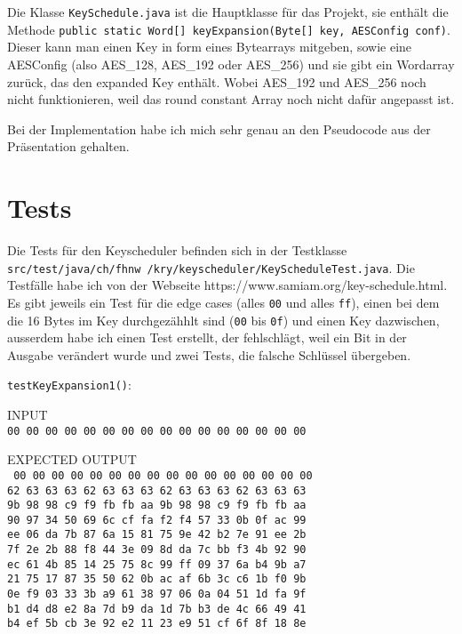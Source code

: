\documentclass[12pt, letterpaper]{article}
\newcommand{\code}[1]{\texttt{#1}}
\begin{document}
Die Klasse \code{KeySchedule.java} ist die Hauptklasse für das Projekt, sie enthält die Methode \code{public static Word[] keyExpansion(Byte[] key, AESConfig conf)}. Dieser kann man einen Key in form eines Bytearrays mitgeben, sowie eine AESConfig (also AES\_128, AES\_192 oder AES\_256) und sie gibt ein Wordarray zurück, das den expanded Key enthält. Wobei AES\_192 und AES\_256 noch nicht funktionieren, weil das round constant Array noch nicht dafür angepasst ist.

Bei der Implementation habe ich mich sehr genau an den Pseudocode aus der Präsentation gehalten.

\newpage
\section*{Tests}
Die Tests für den Keyscheduler befinden sich in der Testklasse \code{src/test/java/ch/fhnw /kry/keyscheduler/KeyScheduleTest.java}. Die Testfälle habe ich von der Webseite https://www.samiam.org/key-schedule.html. Es gibt jeweils ein Test für die edge cases (alles \code{00} und alles \code{ff}), einen bei dem die 16 Bytes im Key durchgezähhlt sind (\code{00} bis \code{0f}) und einen Key dazwischen, ausserdem habe ich einen Test erstellt, der fehlschlägt, weil ein Bit in der Ausgabe verändert wurde und zwei Tests, die falsche Schlüssel übergeben.

\code{testKeyExpansion1()}:

INPUT\\
\code{00 00 00 00 00 00 00 00 00 00 00 00 00 00 00 00}

EXPECTED OUTPUT\\
\code{
00 00 00 00 00 00 00 00 00 00 00 00 00 00 00 00\\
62 63 63 63 62 63 63 63 62 63 63 63 62 63 63 63\\
9b 98 98 c9 f9 fb fb aa 9b 98 98 c9 f9 fb fb aa\\
90 97 34 50 69 6c cf fa f2 f4 57 33 0b 0f ac 99\\
ee 06 da 7b 87 6a 15 81 75 9e 42 b2 7e 91 ee 2b\\
7f 2e 2b 88 f8 44 3e 09 8d da 7c bb f3 4b 92 90\\
ec 61 4b 85 14 25 75 8c 99 ff 09 37 6a b4 9b a7\\
21 75 17 87 35 50 62 0b ac af 6b 3c c6 1b f0 9b\\
0e f9 03 33 3b a9 61 38 97 06 0a 04 51 1d fa 9f\\
b1 d4 d8 e2 8a 7d b9 da 1d 7b b3 de 4c 66 49 41\\
b4 ef 5b cb 3e 92 e2 11 23 e9 51 cf 6f 8f 18 8e
}
\end{document}
